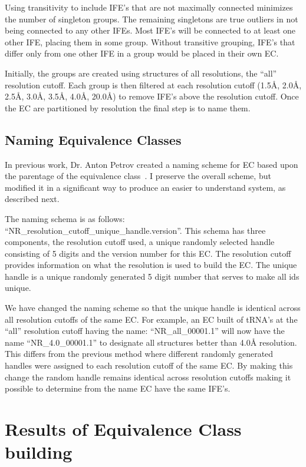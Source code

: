 Using transitivity to include IFE's that are not maximally connected minimizes
the number of singleton groups. The remaining singletons are true outliers in
not being connected to any other IFEs. Most IFE's will be connected to at least
one other IFE, placing them in some group. Without transitive grouping,
IFE's that differ only from one other IFE in a group would be placed in their
own EC\@.

Initially, the groups are created using structures of all resolutions, the
``all'' resolution cutoff. Each group is then filtered at each resolution cutoff
(1.5{\AA}, 2.0{\AA}, 2.5{\AA}, 3.0{\AA}, 3.5{\AA}, 4.0{\AA}, 20.0{\AA}) to
remove IFE's above the resolution cutoff. Once the EC are partitioned by
resolution the final step is to name them.

\subsection{Naming Equivalence Classes}

In previous work, Dr. Anton Petrov created a naming scheme for EC based upon the
parentage of the equivalence class~\cite{Petrov2013}. I preserve the overall
scheme, but modified it in a significant way to produce an easier to understand
system, as described next.

The naming schema is as follows:
``NR\_{resolution\_cutoff}\_{unique\_handle}.{version}''. This schema has three
components, the resolution cutoff used, a unique randomly selected handle
consisting of 5 digits and the version number for this EC\@. The resolution
cutoff provides information on what the resolution is used to build the EC\@.
The unique handle is a unique randomly generated 5 digit number that serves to
make all ids unique.

We have changed the naming scheme so that the unique handle is identical across
all resolution cutoffs of the same EC\@. For example, an EC built of tRNA's at the
``all'' resolution cutoff having the name: ``NR\_all\_00001.1'' will now have
the name ``NR\_4.0\_00001.1'' to designate all structures better than 4.0{\AA}
resolution. This differs from the previous method where different randomly
generated handles were assigned to each resolution cutoff of the same EC\@. By
making this change the random handle remains identical across resolution cutoffs
making it possible to determine from the name EC have the same IFE's.

\section{Results of Equivalence Class building}

